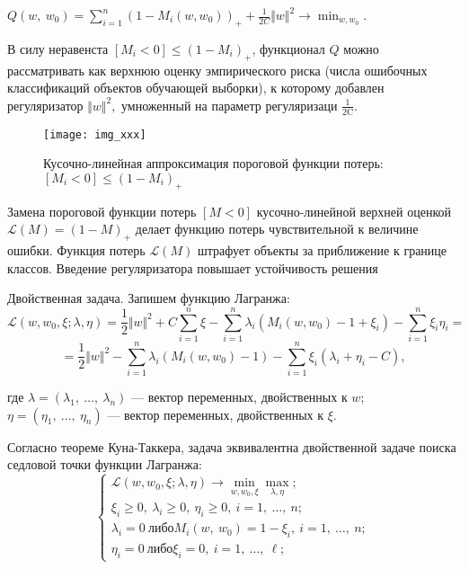 \documentclass[12pt]{article}
\begin{document}
	\begin{center}
		$Q(w,\displaystyle \ w_{0})=\sum_{i=1}^{n}(1-M_{i}(w, w_{0}))_{+}+\frac{1}{2C}\Vert w\Vert^{2}\rightarrow\min_{w,w_{0}}$.   
	\end{center}
	
	В силу неравенста $[M_{i}<0]\leq(1-M_{i})_{+}$, функционал $Q$ можно 	рассматривать как верхнюю оценку эмпирического риска (числа ошибочных классификаций объектов обучающей выборки), к которому добавлен регуляризатор $\Vert w\Vert^{2},$ умноженный на параметр регуляризаци $\displaystyle \frac{1}{2\mathrm{C}}.$ 
	
	\begin{figure}[!ht]
		\centering
		\texttt{[image: img\_xxx]}
		\caption{Кусочно-линейная аппроксимация пороговой функции потерь: $[M_{i}<0]\leq(1-M_{i})_{+}$}
		\label{4}
	\end{figure}
	
	Замена пороговой функции потерь $[M<0]$ кусочно-линейной верхней оценкой
	$\mathcal{L}(M)=(1-M)_{+}$ делает функцию потерь чувствительной к величине ошибки. Функция потерь $\mathcal{L}(M)$ штрафует объекты за приближение к границе классов. Введение регуляризатора повышает устойчивость решения
	
	Двойственная задача. Запишем функцию Лагранжа:
	$$
	\mathcal{L}(w, w_{0}, \xi;\lambda, \eta)=\frac{1}{2}\Vert w\Vert^{2}+C \sum_{i=1}^{n} \xi-\sum_{i=1}^{n}\lambda_{i}(M_{i}(w,w_{0})-1+\xi_{i})-\sum_{i=1}^{n} \xi_{i}\eta_i=
	$$
	$$
	=\frac{1}{2}\Vert w\Vert^{2}-\sum_{i=1}^{n}\lambda_{i}(M_{i}(w,w_{0})-1)-\sum_{i=1}^{n}\xi_{i}(\lambda_{i}+\eta_{i}-C),
	$$
	
	где $\lambda=(\lambda_{1},\ \ldots,\ \lambda_{n})$ --- вектор переменных, двойственных к $w$; $\eta=(\eta_{1},\ \ldots,\ \eta_{n})$ --- вектор
	переменных, двойственных к $\xi$.
	
	Согласно теореме Куна-Таккера, задача эквивалентна двойственной задаче поиска седловой точки функции Лагранжа:
	$$
	\begin{cases}
		\mathcal{L}(w, w_{0}, \xi;\lambda,\eta)\rightarrow \underset{w,w_{0},\xi} \min  \underset{\lambda,\eta} \max; \\
		\xi_{i}\geq 0,\ \lambda_{i}\geq 0,\ \eta_{i}\geq 0,\ i=1,\ \ldots,\ n;\\
		\lambda_{i}=0\ либо M_{i}(w,\ w_{0})=1-\xi_{i},\ i=1,\ \ldots,\ n;\\
		\eta_{i}=0\ либо \xi_{i}=0,\ i=1,\ \ldots,\ \ell;
	\end{cases}
	$$
	
\end{document}
